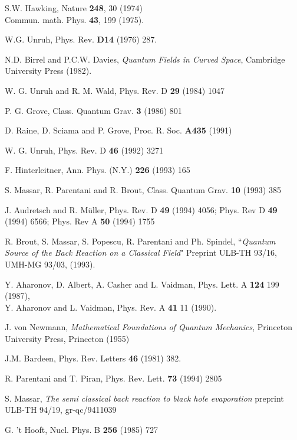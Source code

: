 \documentclass[12pt]{article}
\begin{document}
\begin{thebibliography}{99}


S.W. Hawking, Nature {\bf 248}, 30 (1974)\\
Commun. math. Phys. {\bf 43}, 199 (1975).

 W.G. Unruh, Phys. Rev. {\bf D14} (1976) 287.

N.D. Birrel and P.C.W. Davies, {\it Quantum Fields in Curved
Space},
Cambridge University Press (1982).


W. G. Unruh  and  R. M. Wald, Phys. Rev. D {\bf 29} (1984) 1047


 P. G. Grove, Class. Quantum Grav. {\bf 3} (1986) 801

 D. Raine, D. Sciama and P. Grove, Proc. R. Soc. {\bf A435}
(1991)


W. G. Unruh, Phys. Rev. D {\bf 46} (1992) 3271



 F. Hinterleitner, Ann. Phys. (N.Y.) {\bf 226} (1993) 165


 S. Massar, R. Parentani and R. Brout, Class. Quantum
Grav.
{\bf 10} (1993) 385

J. Audretsch and R. M\"uller, Phys. Rev. D {\bf 49} (1994)
 4056; Phys. Rev D {\bf 49} (1994) 6566;
Phys. Rev A {\bf 50} (1994) 1755



 R. Brout,
 S. Massar,
  S. Popescu,
   R. Parentani and Ph. Spindel, ``{\it Quantum Source of the Back
Reaction on a
 Classical Field}" Preprint ULB-TH 93/16, UMH-MG 93/03, (1993).


Y. Aharonov, D. Albert, A. Casher and L. Vaidman, Phys.
Lett.
A {\bf 124} 199 (1987),\\
Y. Aharonov and L. Vaidman, Phys. Rev. A {\bf 41} 11 (1990).

J. von Newmann, {\em Mathematical Foundations of Quantum
Mechanics}, Princeton University Press, Princeton (1955)


 J.M. Bardeen, Phys. Rev. Letters {\bf 46} (1981)
382.

 R. Parentani and T. Piran,  Phys. Rev. Lett. {\bf 73} (1994)
2805


  S. Massar, {\em The semi classical back reaction to black
hole evaporation} preprint ULB-TH 94/19, gr-qc/9411039

 G. 't Hooft, Nucl. Phys. B {\bf 256} (1985) 727



\end{thebibliography}
\end{document}
